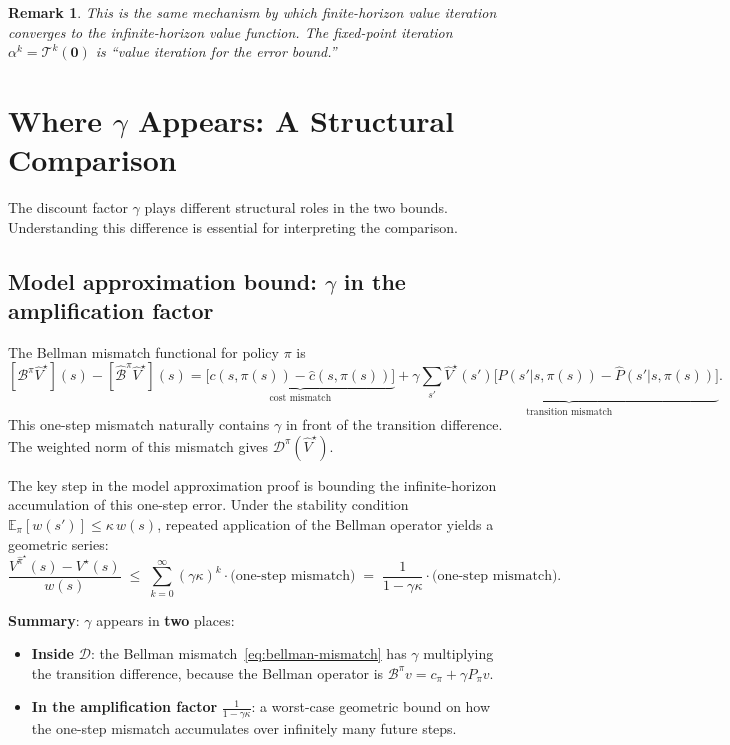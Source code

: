 \documentclass[11pt]{article}
\newcommand{\pihatstar}{\hat\pi^\star}
\newcommand{\Vstar}{V^\star}
\newcommand{\Vhatstar}{\hat V^\star}
\newcommand{\Vpihat}{V^{\pihatstar}}
\newtheorem{remark}{Remark}
\begin{document}
\begin{remark}
This is the same mechanism by which finite-horizon value iteration converges to
the infinite-horizon value function.  The fixed-point iteration $\alpha^k =
\mathcal{T}^k(\mathbf{0})$ is ``value iteration for the error bound.''
\end{remark}

\section{Where $\gamma$ Appears: A Structural Comparison}

The discount factor $\gamma$ plays different structural roles in the two bounds.
Understanding this difference is essential for interpreting the comparison.

\subsection{Model approximation bound: $\gamma$ in the amplification factor}

The Bellman mismatch functional for policy $\pi$ is
\begin{equation}\label{eq:bellman-mismatch}
  [\mathcal{B}^\pi \Vhatstar](s) - [\hat{\mathcal{B}}^\pi \Vhatstar](s)
  = \underbrace{\bigl[c(s,\pi(s)) - \hat c(s,\pi(s))\bigr]}_{\text{cost mismatch}}
  + \gamma \underbrace{\sum_{s'} \Vhatstar(s') \bigl[P(s'|s,\pi(s)) - \hat P(s'|s,\pi(s))\bigr]}_{\text{transition mismatch}}.
\end{equation}
This one-step mismatch naturally contains $\gamma$ in front of the transition
difference.  The weighted norm of this mismatch gives $\mathcal{D}^\pi(\Vhatstar)$.

The key step in the model approximation proof is bounding the infinite-horizon
accumulation of this one-step error.  Under the stability condition
$\mathbb{E}_\pi[w(s')] \le \kappa\, w(s)$, repeated application of the
Bellman operator yields a geometric series:
\begin{equation}\label{eq:geometric}
  \frac{\Vpihat(s) - \Vstar(s)}{w(s)}
  \;\le\; \sum_{k=0}^{\infty} (\gamma\kappa)^k \cdot \text{(one-step mismatch)}
  \;=\; \frac{1}{1 - \gamma\kappa} \cdot \text{(one-step mismatch)}.
\end{equation}

\textbf{Summary}: $\gamma$ appears in \textbf{two} places:
\begin{itemize}
  \item \textbf{Inside} $\mathcal{D}$: the Bellman mismatch~\eqref{eq:bellman-mismatch}
        has $\gamma$ multiplying the transition difference, because the Bellman
        operator is $\mathcal{B}^\pi v = c_\pi + \gamma P_\pi v$.
  \item \textbf{In the amplification factor} $\frac{1}{1-\gamma\kappa}$:
        a worst-case geometric bound on how the one-step mismatch accumulates
        over infinitely many future steps.
\end{itemize}
\end{document}
